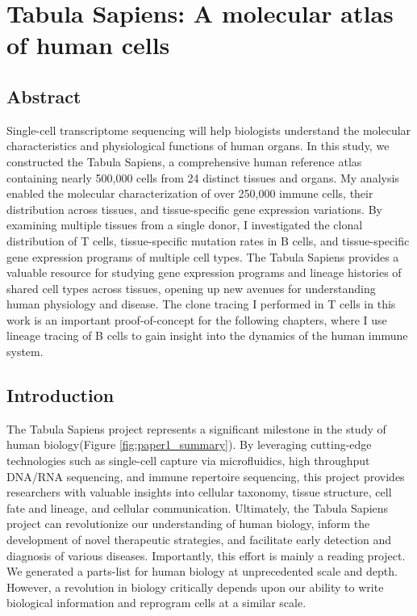 \chapter{Tabula Sapiens: A molecular atlas of human cells}

\section{Abstract}
Single-cell transcriptome sequencing will help biologists understand the molecular characteristics and physiological functions of human organs. In this study, we constructed the Tabula Sapiens, a comprehensive human reference atlas containing nearly 500,000 cells from 24 distinct tissues and organs. My analysis enabled the molecular characterization of over 250,000 immune cells, their distribution across tissues, and tissue-specific gene expression variations. By examining multiple tissues from a single donor, I investigated the clonal distribution of T cells, tissue-specific mutation rates in B cells, and tissue-specific gene expression programs of multiple cell types. The Tabula Sapiens provides a valuable resource for studying gene expression programs and lineage histories of shared cell types across tissues, opening up new avenues for understanding human physiology and disease. The clone tracing I performed in T cells in this work is an important proof-of-concept for the following chapters, where I use lineage tracing of B cells to gain insight into the dynamics of the human immune system. 

\section{Introduction}

The Tabula Sapiens project represents a significant milestone in the study of human biology(Figure \ref{fig:paper1_summary}). By leveraging cutting-edge technologies such as single-cell capture via microfluidics, high throughput DNA/RNA sequencing, and immune repertoire sequencing, this project provides researchers with valuable insights into cellular taxonomy, tissue structure, cell fate and lineage, and cellular communication. Ultimately, the Tabula Sapiens project can revolutionize our understanding of human biology, inform the development of novel therapeutic strategies, and facilitate early detection and diagnosis of various diseases. Importantly, this effort is mainly a reading project. We generated a parts-list for human biology at unprecedented scale and depth. However, a revolution in biology critically depends upon our ability to write biological information and reprogram cells at a similar scale.  

